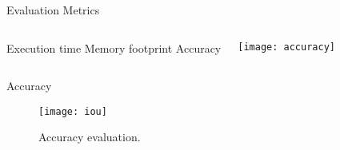 \begin{frame}[t]{Evaluation Metrics} %
    \begin{columns}[c]
            \newline
            \newline
                Execution time
            \newline
            \newline
                Memory footprint
            \newline
            \newline
                Accuracy
           
            \texttt{[image: accuracy]}
    \end{columns}


\end{frame}

\begin{frame}[t]{Accuracy} %
    \begin{figure}
        \centering
        
       \texttt{[image: iou]}
       \caption{Accuracy evaluation. \cite{IoU}}
    \end{figure}
\end{frame}
